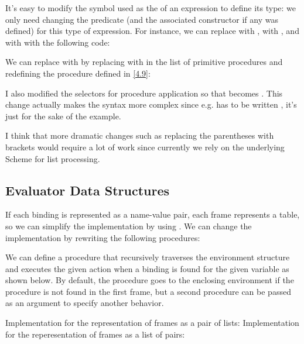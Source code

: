 \begin{exe}[4.10]
    It’s easy to modify the symbol used as the  of an expression to 
    define its type: we only need changing the predicate (and the associated 
    constructor if any was defined) for this type of expression. For instance, 
    we can replace  with ,  with \vscm{&&}, and 
     with \vscm{||} with the following code:

    We can replace  with \vscm{!} by replacing
     with  in the list of primitive 
    procedures and redefining the  procedure defined in 
    \autoref{4.9}:

    I also modified the selectors for procedure application so that
     becomes . This change actually makes 
    the syntax more complex since e.g.  has to be written 
    , it’s just for the sake of the example.

    I think that more dramatic changes such as replacing the parentheses with 
    brackets would require a lot of work since currently we rely on the 
    underlying Scheme for list processing.
\end{exe}

\subsection{Evaluator Data Structures}

\begin{exe}[4.11]
    If each binding is represented as a name-value pair, each frame represents 
    a table, so we can simplify the implementation by using . We can 
    change the implementation by rewriting the following procedures:
\end{exe}

\begin{exe}[4.12]
    \label{4.12}
    We can define a procedure that recursively traverses the environment 
    structure and executes the given action when a binding is found for the 
    given variable as shown below. By default, the procedure goes to the 
    enclosing environment if the procedure is not found in the first frame, but 
    a second procedure can be passed as an argument to specify another behavior.

    Implementation for the representation of frames as a pair of lists:
    Implementation for the reperesentation of frames as a list of pairs:
\end{exe}

